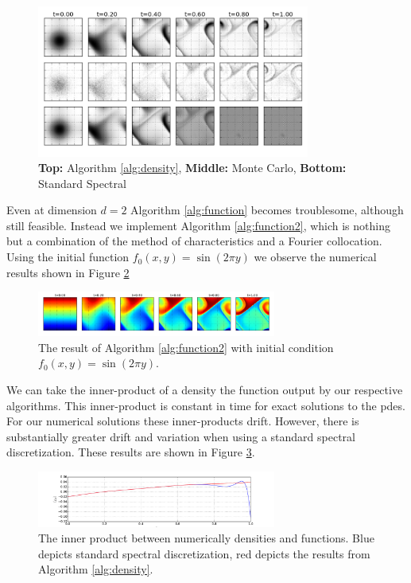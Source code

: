 \documentclass[12pt]{amsart}
\begin{document}
\begin{figure}[h!]
	\centering
	\includegraphics[width=0.8\textwidth]{./images/two_torus.png}
	\caption{ \tiny {\bf Top:} Algorithm \ref{alg:density}, {\bf Middle:} Monte Carlo, {\bf Bottom:} Standard Spectral}
	\label{fig:2 torus}
\end{figure}

Even at dimension $d=2$ Algorithm \ref{alg:function} becomes troublesome, although still feasible.
Instead we implement Algorithm \ref{alg:function2}, which is nothing but a combination of the method of characteristics and a Fourier collocation.
Using the initial function $f_{0}(x,y) = \sin(2\pi y)$ we observe the numerical results shown in Figure \ref{fig:psuedo}

\begin{figure}[h!]
	\centering
	\includegraphics[width=0.7\textwidth]{./images/psuedo_spec_Koopman.png}
	\caption{The result of Algorithm \ref{alg:function2} with initial condition $f_{0}(x,y) = \sin(2\pi y)$.}
	\label{fig:psuedo}
\end{figure}

We can take the inner-product of a density the function output by our respective algorithms.
This inner-product is constant in time for exact solutions to the pdes.
For our numerical solutions these inner-products drift.
However, there is substantially greater drift and variation when using a standard spectral discretization.
These results are shown in Figure \ref{fig:inner}. 
\begin{figure}[h!]
	\centering
	\includegraphics[width=0.7\textwidth]{./images/inner_product_plot.pdf}
	\caption{The inner product between numerically densities and functions.  Blue depicts standard spectral discretization, red depicts the results from Algorithm \ref{alg:density}.}
	\label{fig:inner}
\end{figure}
\end{document}
